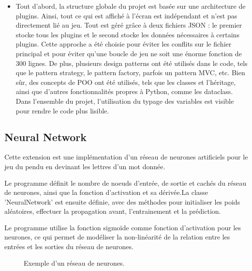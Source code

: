 \documentclass{article}
\begin{document}
\begin{itemize}
    \item Tout d'abord, la structure globale du projet est basée sur une architecture de plugins. Ainsi, tout ce qui est affiché à l'écran est indépendant et n'est pas directement lié au jeu. Tout est géré grâce à deux fichiers JSON : le premier stocke tous les plugins et le second stocke les données nécessaires à certains plugins. Cette approche a été choisie pour éviter les conflits sur le fichier principal et pour éviter qu'une boucle de jeu ne soit une énorme fonction de 300 lignes. De plus, plusieurs design patterns ont été utilisés dans le code, tels que le pattern strategy, le pattern factory, parfois un pattern MVC, etc. Bien sûr, des concepts de POO ont été utilisés, tels que les classes et l'héritage, ainsi que d'autres fonctionnalités propres à Python, comme les dataclass. Dans l'ensemble du projet, l'utilisation du typage des variables est visible pour rendre le code plus lisible.
\end{itemize}
\subsection{Neural Network}
Cette extension est une implémentation d'un réseau de neurones artificiels pour le jeu du pendu en devinant les lettres d'un mot donnée.

Le programme définit le nombre de noeuds d'entrée, de sortie et cachés du réseau de neurones, ainsi que la fonction d'activation et sa dérivée.La classe 'NeuralNetwork' est ensuite définie, avec des méthodes pour initialiser les poids aléatoires, effectuer la propagation avant, l'entrainement et la prédiction.

Le programme utilise la fonction sigmoïde comme fonction d'activation pour les neurones, ce qui permet de modéliser la non-linéarité de la relation entre les entrées et les sorties du réseau de neurones.
\begin{figure}[h]
\centering
{}
\caption{Exemple d'un réseau de neurones.}
\end{figure}
\end{document}

